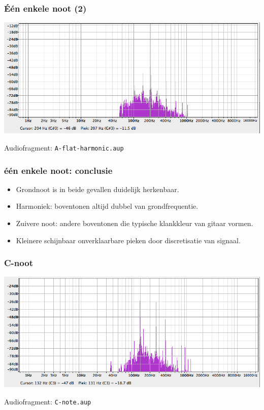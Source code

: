 \documentclass[compress, darktitle, framenumber]{beamer}
\begin{document}
\begin{frame}
\frametitle{\'E\'en enkele noot (2)}
\includegraphics[width=\textwidth]{images/A-flat-harmonic.png}
\begin{block}{Audiofragment:}
\texttt{A-flat-harmonic.aup} 
\end{block}
\end{frame}

\begin{frame}
\frametitle{\'e\'en enkele noot: conclusie}
\begin{itemize}
\item Grondnoot is in beide gevallen duidelijk herkenbaar.
\item Harmoniek: boventonen altijd dubbel van grondfrequentie. 
\item Zuivere noot: andere boventonen die typische klankkleur van gitaar vormen. 
\item Kleinere schijnbaar onverklaarbare pieken door discretisatie van signaal. 
\end{itemize}
\end{frame}


\begin{frame}
\frametitle{C-noot}
\includegraphics[width=\textwidth]{images/C-note.png}
\begin{block}{Audiofragment:}
\texttt{C-note.aup} 
\end{block}
\end{frame}
\end{document}
